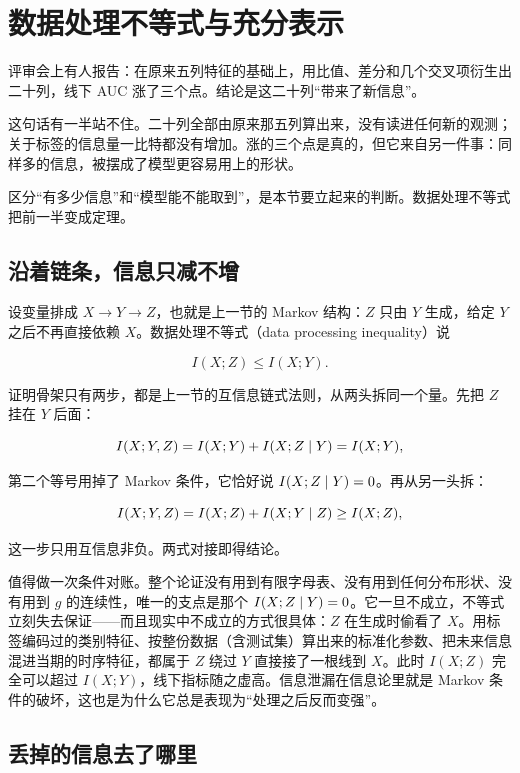 \section{数据处理不等式与充分表示}
\label{sec:07-Information-Theory/02-Joint-Information/04}

评审会上有人报告：在原来五列特征的基础上，用比值、差分和几个交叉项衍生出二十列，线下 AUC 涨了三个点。结论是这二十列``带来了新信息''。

这句话有一半站不住。二十列全部由原来那五列算出来，没有读进任何新的观测；关于标签的信息量一比特都没有增加。涨的三个点是真的，但它来自另一件事：同样多的信息，被摆成了模型更容易用上的形状。

区分``有多少信息''和``模型能不能取到''，是本节要立起来的判断。数据处理不等式把前一半变成定理。

\subsection{沿着链条，信息只减不增}

设变量排成 \(X\to Y\to Z\)，也就是上一节的 Markov 结构：\(Z\) 只由 \(Y\) 生成，给定 \(Y\) 之后不再直接依赖 \(X\)。数据处理不等式（data processing inequality）说

\[
I(X;Z)\le I(X;Y).
\]

证明骨架只有两步，都是上一节的互信息链式法则，从两头拆同一个量。先把 \(Z\) 挂在 \(Y\) 后面：

\[
I(X;Y,Z)=I(X;Y)+I(X;Z\mid Y)=I(X;Y),
\]

第二个等号用掉了 Markov 条件，它恰好说 \(I(X;Z\mid Y)=0\)。再从另一头拆：

\[
I(X;Y,Z)=I(X;Z)+I(X;Y\mid Z)\ge I(X;Z),
\]

这一步只用互信息非负。两式对接即得结论。

值得做一次条件对账。整个论证没有用到有限字母表、没有用到任何分布形状、没有用到 \(g\) 的连续性，唯一的支点是那个 \(I(X;Z\mid Y)=0\)。它一旦不成立，不等式立刻失去保证——而且现实中不成立的方式很具体：\(Z\) 在生成时偷看了 \(X\)。用标签编码过的类别特征、按整份数据（含测试集）算出来的标准化参数、把未来信息混进当期的时序特征，都属于 \(Z\) 绕过 \(Y\) 直接接了一根线到 \(X\)。此时 \(I(X;Z)\) 完全可以超过 \(I(X;Y)\)，线下指标随之虚高。信息泄漏在信息论里就是 Markov 条件的破坏，这也是为什么它总是表现为``处理之后反而变强''。

\subsection{丢掉的信息去了哪里}

